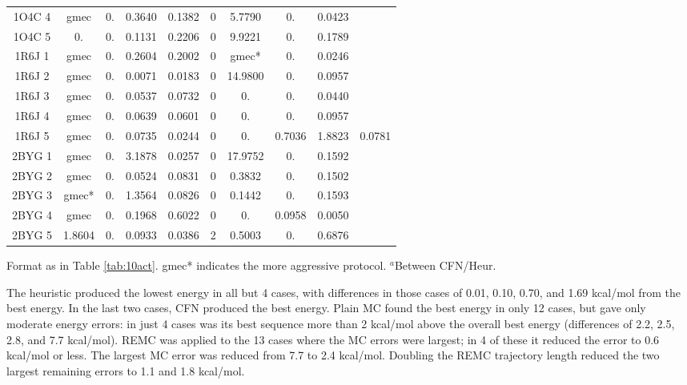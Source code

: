 {{\begin{table}[!htbp]
\begin{center}
\begin{tabular}{cccccccccc}
1O4C 4 &  gmec    & 0.     & 0.3640 & 0.1382 & 0 & 5.7790    & 0.     & 0.0423 &        \\             
1O4C 5 &  0.      & 0.     & 0.1131 & 0.2206 & 0 & 9.9221    & 0.     & 0.1789 &        \\      
1R6J 1 &  gmec    & 0.     & 0.2604 & 0.2002 & 0 & gmec*     & 0.     & 0.0246 &        \\        
1R6J 2 &  gmec    & 0.     & 0.0071 & 0.0183 & 0 & 14.9800   & 0.     & 0.0957 &        \\        
1R6J 3 &  gmec    & 0.     & 0.0537 & 0.0732 & 0 & 0.        & 0.     & 0.0440 &        \\       
1R6J 4 &  gmec    & 0.     & 0.0639 & 0.0601 & 0 & 0.        & 0.     & 0.0957 &        \\        
1R6J 5 &  gmec    & 0.     & 0.0735 & 0.0244 & 0 & 0.        & 0.7036 & 1.8823 & 0.0781 \\        
2BYG 1 &  gmec    & 0.     & 3.1878 & 0.0257 & 0 & 17.9752   & 0.     & 0.1592 &        \\        
2BYG 2 &  gmec    & 0.     & 0.0524 & 0.0831 & 0 & 0.3832    & 0.     & 0.1502 &        \\        
2BYG 3 &  gmec*   & 0.     & 1.3564 & 0.0826 & 0 & 0.1442    & 0.     & 0.1593 &        \\        
2BYG 4 &  gmec    & 0.     & 0.1968 & 0.6022 & 0 & 0.        & 0.0958 & 0.0050 &        \\        
2BYG 5 &  1.8604  & 0.     & 0.0933 & 0.0386 & 2 & 0.5003    & 0.     & 0.6876 &        \\   
\hline
\end{tabular}
{\small \noindent Format as in Table \ref{tab:10act}. gmec* indicates the more aggressive protocol.
$^a$Between CFN/Heur.}
\end{center}
\end{table}




The heuristic produced the lowest energy in all but 4 cases, with differences in those cases of 0.01, 0.10, 0.70, and
1.69 kcal/mol from the best energy. In the last two cases, CFN produced the best energy. Plain MC found the best energy
in only 12 cases, but gave only moderate energy errors: in just 4 cases was its best sequence more than 2 kcal/mol above
the overall best energy (differences of 2.2, 2.5, 2.8, and 7.7 kcal/mol). REMC was applied to the 13 cases where the
MC errors were largest; in 4 of these it reduced the error to 0.6 kcal/mol or less. The largest MC error was reduced
from 7.7 to 2.4 kcal/mol. Doubling the REMC trajectory length reduced the two largest remaining errors to 1.1 and
1.8 kcal/mol.

}}
